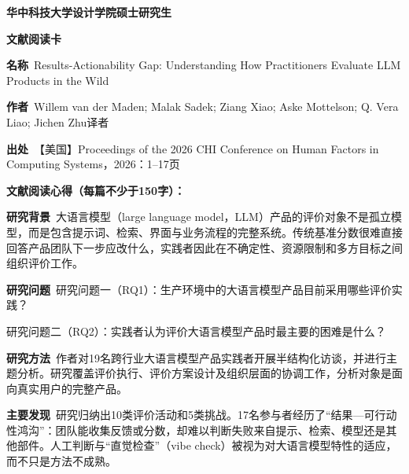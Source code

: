 {}
\label{chap:literature-cards}
\setlength{\parindent}{0pt}
\setlength{\parskip}{0pt}

\begin{center}
{\songti\bfseries\fontsize{18.5pt}{27.75pt}\selectfont 华中科技大学设计学院硕士研究生\par}
{\songti\bfseries\fontsize{18.5pt}{27.75pt}\selectfont 文献阅读卡\par}
\end{center}
\vspace{0.25em}
\noindent\underline{}\par
\vspace{0.35em}
\noindent\textbf{名称}\ Results-Actionability Gap: Understanding How Practitioners Evaluate LLM Products in the Wild\par
\noindent\textbf{作者}\ Willem van der Maden; Malak Sadek; Ziang Xiao; Aske Mottelson; Q. Vera Liao; Jichen Zhu\quad 译者\par
\noindent\textbf{出处}\ 【美国】Proceedings of the 2026 CHI Conference on Human Factors in Computing Systems，2026：1–17\quad 页\par
\vspace{0.35em}
\noindent\textbf{文献阅读心得（每篇不少于150字）：}\par
\noindent\textbf{研究背景}\ 大语言模型（large language model，LLM）产品的评价对象不是孤立模型，而是包含提示词、检索、界面与业务流程的完整系统。传统基准分数很难直接回答产品团队下一步应改什么，实践者因此在不确定性、资源限制和多方目标之间组织评价工作。\par
\noindent\textbf{研究问题}\ 研究问题一（RQ1）：生产环境中的大语言模型产品目前采用哪些评价实践？\par
研究问题二（RQ2）：实践者认为评价大语言模型产品时最主要的困难是什么？\par
\noindent\textbf{研究方法}\ 作者对19名跨行业大语言模型产品实践者开展半结构化访谈，并进行主题分析。研究覆盖评价执行、评价方案设计及组织层面的协调工作，分析对象是面向真实用户的完整产品。\par
\noindent\textbf{主要发现}\ 研究归纳出10类评价活动和5类挑战。17名参与者经历了“结果—可行动性鸿沟”：团队能收集反馈或分数，却难以判断失败来自提示、检索、模型还是其他部件。人工判断与“直觉检查”（vibe check）被视为对大语言模型特性的适应，而不只是方法不成熟。\par
